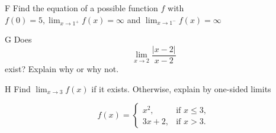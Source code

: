\documentclass[]{article}
\begin{document}
\begin{question}{F}
    Find the equation of a possible function $f$ with $f(0) = 5, \displaystyle{\lim_{x\to1^+}} f(x) = \infty$ and $\displaystyle{\lim_{x\to1^-}} f(x) = \infty$
\end{question}

\begin{question}{G}
    Does
    \[
    \lim_{x \to 2} \frac{|x-2|}{x-2}
    \]
    exist? Explain why or why not.  
\end{question}


\begin{question}{H}
    Find $\displaystyle{\lim_{x\to 3}} f(x)$ if it exists. Otherwise, explain by one-sided limits
    
    \[
        f(x) =
        \begin{cases}
            x^2, & \text{if } x \leq 3, \\
            3x + 2, & \text{if } x > 3.
        \end{cases}
    \]

\end{question}
\end{document}
